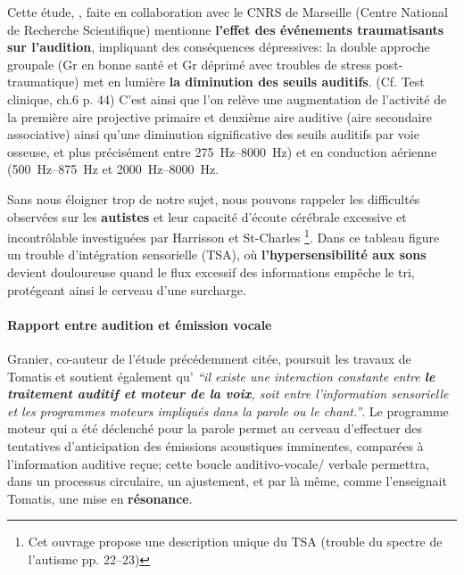 Cette étude, \autocite{affectiveDisorders}, faite
   en collaboration avec
le CNRS de Marseille (Centre National de Recherche Scientifique)
 mentionne \textbf{l'effet des événements
traumatisants sur l'audition}, impliquant des conséquences dépressives:
la double approche groupale (Gr en bonne santé et Gr déprimé avec
troubles de stress post-traumatique) met en lumière \textbf{la diminution des
  seuils auditifs}. (Cf. Test clinique, ch.6 p. 44)
C'est ainsi que l'on relève une augmentation de l'activité de la
première aire projective primaire et deuxième aire auditive (aire
secondaire associative) ainsi qu'une diminution significative des
seuils auditifs par voie osseuse, et plus précisément entre
\SIrange{275}{8000}{\Hz}) et en conduction aérienne
(\SIrange{500}{875}{\Hz} et  \SIrange{2000}{8000}{\Hz}.

Sans nous éloigner trop de notre sujet, nous pouvons rappeler
les difficultés observées sur les
\textbf{autistes} et leur capacité d'écoute cérébrale excessive et
incontrôlable investiguées par Harrisson et St-Charles \autocite {harrisson_autisme_2017}\footnote{Cet ouvrage propose une description unique du TSA
   (trouble du spectre de l'autisme
   pp. 22--23)}. Dans ce tableau
 figure un trouble d'intégration sensorielle (TSA), où
 \textbf{l'hypersensibilité aux sons} devient douloureuse quand le flux excessif
 des
 informations empêche le tri, protégeant ainsi le cerveau d'une surcharge.

\paragraph{Rapport entre audition et émission vocale}


Granier, co-auteur de l'étude \autocite{affectiveDisorders} précédemment citée, poursuit les travaux de Tomatis et soutient également qu'\textit{ ``il existe une
interaction
constante entre  \textbf{le traitement auditif et moteur de la
voix}, soit entre l'information sensorielle et les programmes moteurs impliqués
dans la parole ou le chant.''}.
Le programme moteur qui a été déclenché
pour la parole permet au cerveau d'effectuer des tentatives d'anticipation
des émissions acoustiques imminentes, comparées à l'information
auditive reçue; cette boucle
auditivo-vocale/ verbale permettra, dans un processus circulaire, un ajustement,
et par là même, comme l'enseignait Tomatis, une mise en \textbf{résonance}.

